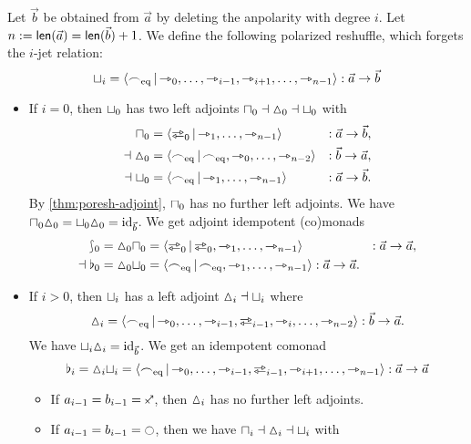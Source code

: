 \documentclass[a4paper]{memoir}
\begin{document}
\begin{example} \label{ex:cohesion}
	Let $\vec b$ be obtained from $\vec a$ by deleting the anpolarity with degree $i$.
	Let $n := \mathsf{len}(\vec a) = \mathsf{len}(\vec b) + 1$.
	We define the following polarized reshuffle, which forgets the $i$-jet relation:
	\[
		{\sqcup}_i = \mathopen{}\left\langle {\frown}_{{\mathrm{eq}}} \,\middle|\, {\rightarrowtriangle}_0, \ldots, {\rightarrowtriangle}_{i-1}, {\rightarrowtriangle}_{i+1}, \ldots, {\rightarrowtriangle}_{n-1} \right\rangle\mathclose{} : \vec a \to \vec b
	\]
	\begin{itemize}
		\item If $i = 0$, then ${\sqcup}_0$ has two left adjoints ${\sqcap}_0 \dashv {\vartriangle}_0 \dashv {\sqcup}_0$ with
		\begin{align*}
			\cohpi_0 &= \reshlist{\infrajetsym_0}{\jetsym_1, \ldots, \jetsym_{n-1}} &: \vec a \to \vec b, \\
			\dashv
			\cohdisc_0 &= \reshlist{\eqtysym}{\eqtysym, \jetsym_0, \ldots, \jetsym_{n-2}} &: \vec b \to \vec a, \\
			\dashv
			\cohfget_0 &= \reshlist{\eqtysym}{\jetsym_1, \ldots, \jetsym_{n-1}} &: \vec a \to \vec b.
		\end{align*}
		By \cref{thm:poresh-adjoint}, ${\sqcap}_0$ has no further left adjoints.
		We have ${\sqcap}_0 {\vartriangle}_0 = {\sqcup}_0 {\vartriangle}_0 = \mathrm{id}_{\vec b}$. We get adjoint idempotent (co)monads
		\begin{align*}
			\shp_0 = \cohdisc_0 \cohpi_0 &= \reshlist{\infrajet_0}{\infrajet_0, \jetsym_1, \ldots, \jetsym_{n-1}} &: \vec a \to \vec a, \\
			\dashv
			\flat_0 = \cohdisc_0 \cohfget_0 &= \reshlist{\eqtysym}{\eqtysym, \jetsym_1, \ldots, \jetsym_{n-1}} : \vec a \to \vec a.
		\end{align*}
		\item If $i > 0$, then ${\sqcup}_i$ has a left adjoint ${\vartriangle}_i \dashv {\sqcup}_i$ where
		\[
			\cohdisc_i = \reshlist{\eqtysym}{\jetsym_0, \ldots, \jetsym_{i-1}, \infrajetsym_{i-1}, \jetsym_i, \ldots, \jetsym_{n-2}} : \vec b \to \vec a.
		\]
		We have ${\sqcup}_i {\vartriangle}_i = \mathrm{id}_{\vec b}$. We get an idempotent comonad
		\[
			\flat_i = \cohdisc_i \cohfget_i = \reshlist{\eqtysym}{\jetsym_0, \ldots, \jetsym_{i-1}, \infrajetsym_{i-1}, \jetsym_{i+1}, \ldots, \jetsym_{n-1}} : \vec a \to \vec a
		\]
		\begin{itemize}
			\item If $a_{i-1} = b_{i-1} = \ypolar$, then ${\vartriangle}_i$ has no further left adjoints.
			\item If $a_{i-1} = b_{i-1} = \npolar$, then we have ${\sqcap}_i \dashv {\vartriangle}_i \dashv {\sqcup}_i$ with

\end{itemize}
\end{itemize}
\end{example}
\end{document}
